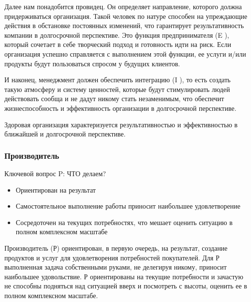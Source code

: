 \documentclass{../industrial-development}
\begin{document}
Далее нам понадобится провидец. Он определяет направление, которого должна придерживаться организация. Такой человек по натуре способен на упреждающие действия в обстановке постоянных изменений, что гарантирует результативность компании в долгосрочной перспективе. Это функция предпринимателя (E ), который сочетает в себе творческий подход и готовность идти на риск. Если организация успешно справляется с выполнением этой функции, ее услуги и/или продукты будут пользоваться спросом у будущих клиентов.

И наконец, менеджмент должен обеспечить интеграцию (I ), то есть создать такую атмосферу и систему ценностей, которые будут стимулировать людей действовать сообща и не дадут никому стать незаменимым, что обеспечит жизнеспособность и эффективность организации в долгосрочной перспективе.

Здоровая организация характеризуется результативностью и эффективностью в ближайшей и долгосрочной перспективе. 



\begin{frame} \frametitle{Производитель}
	 \begin{block}{Ключевой вопрос P:}
		ЧТО делаем?
	\end{block}	
 \begin{itemize}
	 \item Ориентирован на результат
	 \item Самостоятельное выполнение работы приносит наибольшее удовлетворение
	 \item Сосредоточен на текущих потребностях, что мешает оценить ситуацию в полном комплексном масштабе
 \end{itemize}
\end{frame}
\lecturenotes
Производитель (Р) ориентирован, в первую очередь, на результат, создание продуктов и услуг для удовлетворения потребностей покупателей. Для Р выполненная задача собственными руками, не делегируя никому, приносит наибольшее удовольствие. Р ориентированы на текущие потребности и зачастую не способны подняться над ситуацией вверх и посмотреть с высоты, оценить ее в полном комплексном масштабе. 
\end{document}
